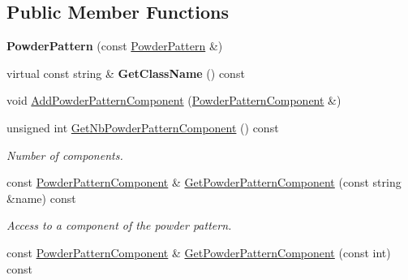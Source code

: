 \subsection*{Public Member Functions}
\begin{DoxyCompactItemize}
\item 
\mbox{\label{class_obj_cryst_1_1_powder_pattern_a6815f5a573037f29f5d7c5975c7d2360}} 
{\bfseries Powder\+Pattern} (const \mbox{\hyperlink{class_obj_cryst_1_1_powder_pattern}{Powder\+Pattern}} \&)
\item 
\mbox{\label{class_obj_cryst_1_1_powder_pattern_af149ed118f3a3afb50aed3d7521395d3}} 
virtual const string \& {\bfseries Get\+Class\+Name} () const
\item 
void \mbox{\hyperlink{class_obj_cryst_1_1_powder_pattern_a0190046adad7091ca0d7818b1ced7bb2}{Add\+Powder\+Pattern\+Component}} (\mbox{\hyperlink{class_obj_cryst_1_1_powder_pattern_component}{Powder\+Pattern\+Component}} \&)
\item 
\mbox{\label{class_obj_cryst_1_1_powder_pattern_ac8b0ef9648e6e53878a38c1c8aceeb49}} 
unsigned int \mbox{\hyperlink{class_obj_cryst_1_1_powder_pattern_ac8b0ef9648e6e53878a38c1c8aceeb49}{Get\+Nb\+Powder\+Pattern\+Component}} () const
\begin{DoxyCompactList}\small\item\em Number of components. \end{DoxyCompactList}\item 
\mbox{\label{class_obj_cryst_1_1_powder_pattern_a3ffdfff8984f78248439c1fd6b5e9816}} 
const \mbox{\hyperlink{class_obj_cryst_1_1_powder_pattern_component}{Powder\+Pattern\+Component}} \& \mbox{\hyperlink{class_obj_cryst_1_1_powder_pattern_a3ffdfff8984f78248439c1fd6b5e9816}{Get\+Powder\+Pattern\+Component}} (const string \&name) const
\begin{DoxyCompactList}\small\item\em Access to a component of the powder pattern. \end{DoxyCompactList}\item 
\mbox{\label{class_obj_cryst_1_1_powder_pattern_a47f2a7217b4e1b8c3561260912757e74}} 
const \mbox{\hyperlink{class_obj_cryst_1_1_powder_pattern_component}{Powder\+Pattern\+Component}} \& \mbox{\hyperlink{class_obj_cryst_1_1_powder_pattern_a47f2a7217b4e1b8c3561260912757e74}{Get\+Powder\+Pattern\+Component}} (const int) const

\end{DoxyCompactItemize}
